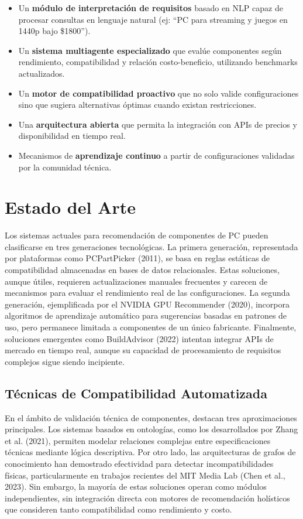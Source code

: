 \documentclass{llncs}
\begin{document}
\begin{itemize}
	\item Un \textbf{módulo de interpretación de requisitos} basado en NLP capaz de procesar consultas en lenguaje natural (ej: ``PC para streaming y juegos en 1440p bajo \$1800'').
	\item Un \textbf{sistema multiagente especializado} que evalúe componentes según rendimiento, compatibilidad y relación costo-beneficio, utilizando benchmarks actualizados.
	\item Un \textbf{motor de compatibilidad proactivo} que no solo valide configuraciones sino que sugiera alternativas óptimas cuando existan restricciones.
	\item Una \textbf{arquitectura abierta} que permita la integración con APIs de precios y disponibilidad en tiempo real.
	\item Mecanismos de \textbf{aprendizaje continuo} a partir de configuraciones validadas por la comunidad técnica.
\end{itemize}


\section{Estado del Arte}
\label{sec:estado_arte}


Los sistemas actuales para recomendación de componentes de PC pueden clasificarse en tres generaciones tecnológicas. La primera generación, representada por plataformas como PCPartPicker (2011), se basa en reglas estáticas de compatibilidad almacenadas en bases de datos relacionales. Estas soluciones, aunque útiles, requieren actualizaciones manuales frecuentes y carecen de mecanismos para evaluar el rendimiento real de las configuraciones. La segunda generación, ejemplificada por el NVIDIA GPU Recommender (2020), incorpora algoritmos de aprendizaje automático para sugerencias basadas en patrones de uso, pero permanece limitada a componentes de un único fabricante. Finalmente, soluciones emergentes como BuildAdvisor (2022) intentan integrar APIs de mercado en tiempo real, aunque su capacidad de procesamiento de requisitos complejos sigue siendo incipiente.

\subsection{Técnicas de Compatibilidad Automatizada}
En el ámbito de validación técnica de componentes, destacan tres aproximaciones principales. Los sistemas basados en ontologías, como los desarrollados por Zhang et al. (2021), permiten modelar relaciones complejas entre especificaciones técnicas mediante lógica descriptiva. Por otro lado, las arquitecturas de grafos de conocimiento han demostrado efectividad para detectar incompatibilidades físicas, particularmente en trabajos recientes del MIT Media Lab (Chen et al., 2023). Sin embargo, la mayoría de estas soluciones operan como módulos independientes, sin integración directa con motores de recomendación holísticos que consideren tanto compatibilidad como rendimiento y costo.
\end{document}
